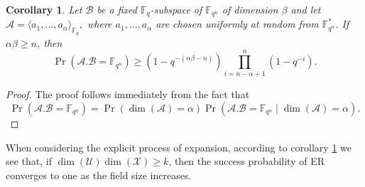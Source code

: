 \documentclass{article}
\newtheorem{corollary}{Corollary}
\newcommand{\Fq}{\mathbb{F}_{q}}
\newcommand{\Fqn}{\mathbb{F}_{q^n}}
\newcommand{\calA}{\mathcal{A}}
\newcommand{\calB}{\mathcal{B}}
\newcommand{\calU}{\mathcal{U}}
\newcommand{\calX}{\mathcal{X}}
\begin{document}
\begin{corollary}
\label{cor:expected_dimension_without_independence}
Let $\calB$ be a fixed $\Fq$-subspace of $\Fqn$ of dimension $\beta$ and let $\calA=\langle a_1,\ldots,a_\alpha\rangle_{\Fq},$ where $a_1,\ldots,a_\alpha$ are chosen uniformly at random from $\Fqn^*$. If $\alpha\beta\ge n$, then
\[
\Pr(\calA.\calB=\Fqn)
\ge
\left(1-q^{-(\alpha\beta-n)}\right)\prod_{i=n-\alpha+1}^{n}\left(1-q^{-i}\right).
\]
\end{corollary}

\begin{proof}
The proof follows immediately from the fact that
\[
\Pr(\calA.\calB=\Fqn)=\Pr(\dim(\calA)=\alpha)\Pr(\calA.\calB=\Fqn\mid \dim(\calA)=\alpha).
\]
\end{proof}
When considering the explicit process of expansion, according to corollary \ref{cor:expected_dimension_without_independence} we see that,  if $\dim(\calU)\dim(\calX)\geq k$, then the success probability of ER converges to one as the field size increases. 
\end{document}
